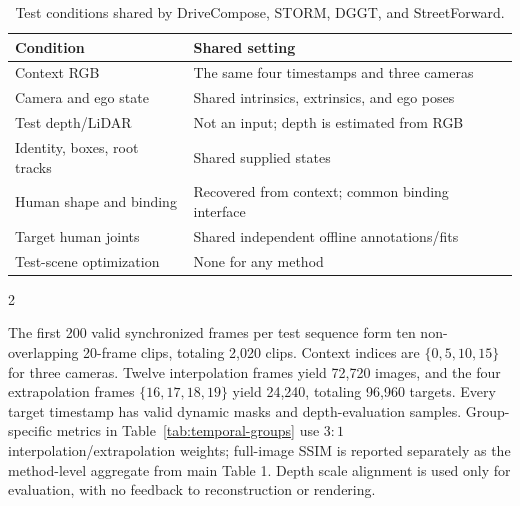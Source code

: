 \begin{table}[H]
\centering\small
\setlength{\tabcolsep}{4pt}
\caption{Test conditions shared by DriveCompose, STORM, DGGT, and StreetForward.}
\label{tab:shared-inputs}
\begin{tabular}{@{}lp{}@{}}
\toprule
Condition & Shared setting \\
\midrule
Context RGB & The same four timestamps and three cameras \\
Camera and ego state & Shared intrinsics, extrinsics, and ego poses \\
Test depth/LiDAR & Not an input; depth is estimated from RGB \\
Identity, boxes, root tracks & Shared supplied states \\
Human shape and binding & Recovered from context; common binding interface \\
Target human joints & Shared independent offline annotations/fits \\
Test-scene optimization & None for any method \\
\bottomrule
\end{tabular}
\end{table}
\begin{multicols}{2}

The first 200 valid synchronized frames per test sequence form ten non-overlapping 20-frame clips, totaling 2,020 clips. Context indices are $\{0,5,10,15\}$ for three cameras. Twelve interpolation frames yield 72,720 images, and the four extrapolation frames $\{16,17,18,19\}$ yield 24,240, totaling 96,960 targets. Every target timestamp has valid dynamic masks and depth-evaluation samples. Group-specific metrics in Table~\ref{tab:temporal-groups} use $3{:}1$ interpolation/extrapolation weights; full-image SSIM is reported separately as the method-level aggregate from main Table 1. Depth scale alignment is used only for evaluation, with no feedback to reconstruction or rendering.

\end{multicols}
